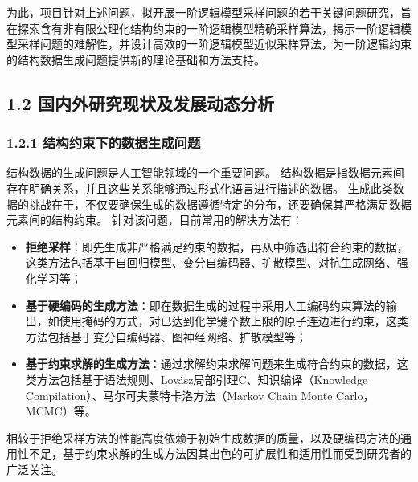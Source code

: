 \documentclass[12pt,UTF8,AutoFakeBold=3,a4paper]{ctexart} %
\begin{document}
为此，项目针对上述问题，拟开展一阶逻辑模型采样问题的若干关键问题研究，旨在探索含有非有限公理化结构约束的一阶逻辑模型精确采样算法，揭示一阶逻辑模型采样问题的难解性，并设计高效的一阶逻辑模型近似采样算法，为一阶逻辑约束的结构数据生成问题提供新的理论基础和方法支持。

\subsection{1.2 国内外研究现状及发展动态分析}

\subsubsection{1.2.1 结构约束下的数据生成问题}

结构数据的生成问题是人工智能领域的一个重要问题。
结构数据是指数据元素间存在明确关系，并且这些关系能够通过形式化语言进行描述的数据。
生成此类数据的挑战在于，不仅要确保生成的数据遵循特定的分布，还要确保其严格满足数据元素间的结构约束。
针对该问题，目前常用的解决方法有：
\begin{itemize}
	\item \textbf{拒绝采样}：即先生成非严格满足约束的数据，再从中筛选出符合约束的数据，这类方法包括基于自回归模型、变分自编码器、扩散模型、对抗生成网络、强化学习等；
	\item \textbf{基于硬编码的生成方法}：即在数据生成的过程中采用人工编码约束算法的输出，如使用掩码的方式，对已达到化学键个数上限的原子连边进行约束，这类方法包括基于变分自编码器、图神经网络、扩散模型等；
	\item \textbf{基于约束求解的生成方法}：通过求解约束求解问题来生成符合约束的数据，这类方法包括基于语法规则、Lovász局部引理C、知识编译（Knowledge Compilation）、马尔可夫蒙特卡洛方法（Markov Chain Monte Carlo，MCMC）等。
\end{itemize}
相较于拒绝采样方法的性能高度依赖于初始生成数据的质量，以及硬编码方法的通用性不足，基于约束求解的生成方法因其出色的可扩展性和适用性而受到研究者的广泛关注。
\end{document}
